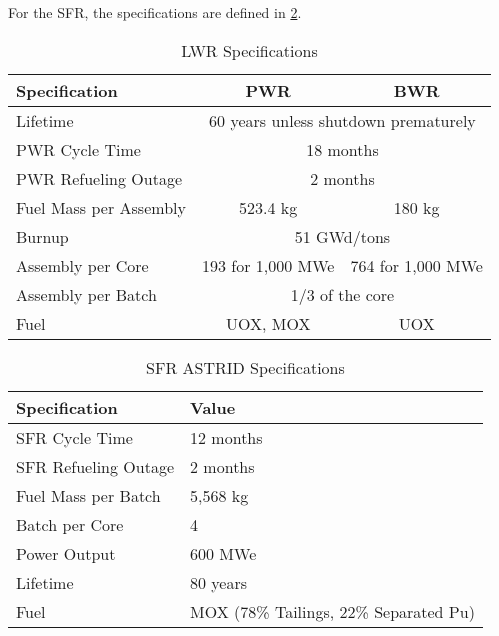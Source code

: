 For the \gls{SFR}, the specifications are defined in \cref{tab:sfr}.

\begin{table}[h]
	\centering
	\begin{tabularx}{\textwidth}{bcc}
		\hline
		\textbf{Specification} & \textbf{\gls{PWR}} & \textbf{\gls{BWR}} \\
		\hline
		Lifetime & \multicolumn{2}{c}{60 years unless shutdown prematurely} \\
		PWR Cycle Time & \multicolumn{2}{c}{18 months}\\ 
		PWR Refueling Outage & \multicolumn{2}{c}{2 months} \\
		Fuel Mass per Assembly & 523.4 kg & 180 kg \\
		Burnup & \multicolumn{2}{c}{51 GWd/tons }\\
		Assembly per Core & 193 for 1,000 MWe & 764 for 1,000 MWe\\
		Assembly per Batch & \multicolumn{2}{c}{1/3 of the core }\\
		Fuel & \gls{UOX}, \gls{MOX} & \gls{UOX} \\
		\hline
	\end{tabularx}
	\caption {\gls{LWR} Specifications}
	\label{tab:lwr}
	\end{table}
	
\begin{table}[h]
	\centering
	\begin{tabularx}{\textwidth}{bb}
		\hline
		\textbf{Specification} &\textbf{ Value} \\
		\hline
		SFR Cycle Time & 12 months \\ 
		SFR Refueling Outage & 2 months \\
		Fuel Mass per Batch & 5,568 kg \\
		Batch per Core & 4 \\
		Power Output & 600 MWe \\
		Lifetime & 80 years \\
		Fuel & {\small \gls{MOX} (78\% Tailings, 22\% Separated Pu)}\\
		\hline
	\end{tabularx}
	\caption {\gls{SFR} ASTRID Specifications \cite{varaine_pre-conceptual_2012}}
	\label{tab:sfr}
\end{table}
\FloatBarrier

